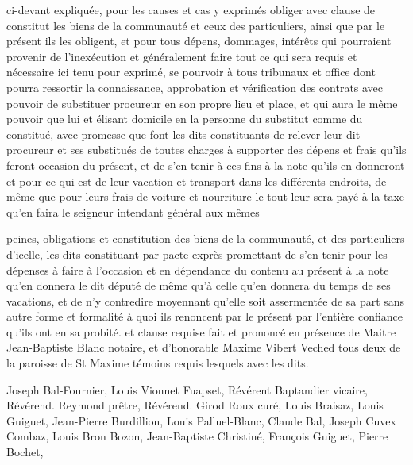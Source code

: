 \documentclass[a4paper,twoside,openany]{article}
\begin{document}
ci-devant expliquée, pour les causes et cas y exprimés 
obliger avec clause de constitut les biens de la 
communauté et ceux des particuliers, ainsi que 
par le présent ils les obligent, et pour tous dépens, 
dommages, intérêts qui pourraient provenir de 
l’inexécution et généralement faire tout ce qui sera 
requis et nécessaire ici tenu pour exprimé, se pourvoir 
à tous tribunaux et office dont pourra ressortir la 
connaissance, approbation et vérification des contrats avec 
pouvoir de substituer procureur en son propre lieu 
et place, et qui aura le même pouvoir que lui et 
élisant domicile en la personne du substitut comme 
du constitué, avec promesse que font les dits constituants 
de relever leur dit procureur et ses substitués de toutes 
charges à supporter des dépens et frais qu’ils 
feront occasion du présent, et de s’en tenir à ces 
fins à la note qu’ils en donneront et pour ce qui est 
de leur vacation et transport dans les différents 
endroits, de même que pour leurs frais de voiture 
et nourriture le tout leur sera payé à la taxe 
qu’en faira  le seigneur intendant général aux mêmes


peines, obligations et constitution des biens de la 
communauté, et des particuliers d’icelle, les dits 
constituant par pacte exprès promettant de s’en 
tenir pour les dépenses à faire à l’occasion et en 
dépendance du contenu au présent à la note 
qu’en donnera le dit député de même qu’à celle 
qu’en donnera du temps de ses vacations, et de n’y 
contredire moyennant qu’elle soit assermentée 
de sa part sans autre forme et formalité à quoi 
ils renoncent par le présent par l’entière confiance 
qu’ils ont en sa probité. et clause requise fait 
et prononcé en présence de Maitre Jean-Baptiste Blanc 
notaire, et d’honorable Maxime Vibert Veched tous deux 
de la paroisse de St Maxime témoins requis 
lesquels avec les dits. 




Joseph Bal-Fournier, 
Louis Vionnet Fuapset, 
Révérent Baptandier vicaire, 
Révérend. Reymond prêtre, 
Révérend. Girod Roux curé, 
Louis Braisaz, 
Louis Guiguet, 
Jean-Pierre Burdillion, 
Louis Palluel-Blanc, 
Claude Bal, 
Joseph Cuvex Combaz, 
Louis Bron Bozon, 
Jean-Baptiste Christiné, 
François Guiguet, 
Pierre Bochet, 
\end{document}
